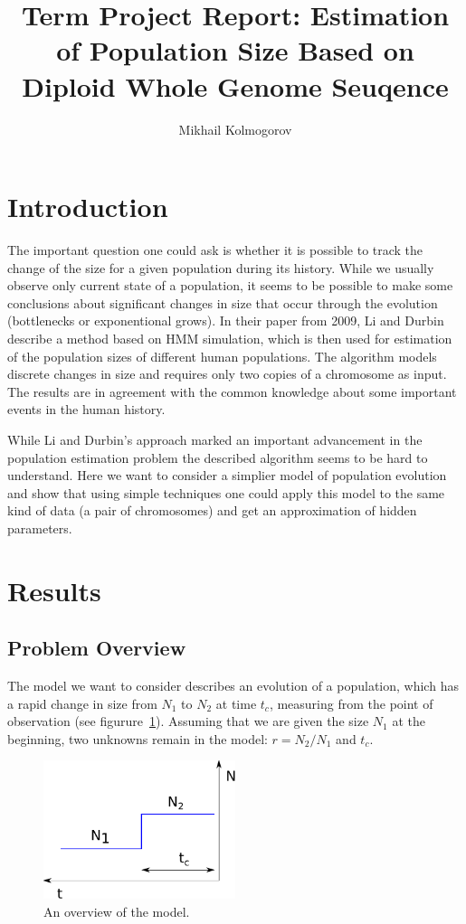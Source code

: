 \documentclass[a4paper]{article}
\begin{document}
\title{Term Project Report: Estimation of Population Size Based on Diploid Whole Genome Seuqence}
\author{Mikhail Kolmogorov}
\maketitle

\section{Introduction}

The important question one could ask is whether it is possible to track the change of the size for
a given population during its history. While we usually observe only current state
of a population, it seems to be possible to make some conclusions about significant
changes in size that occur through the evolution (bottlenecks or exponentional grows). 
In their paper from 2009, Li and Durbin describe a method based on HMM simulation,
which is then used for estimation of the population sizes of different human populations.
The algorithm models discrete changes in size and requires only two copies of a chromosome as input.
The results are in agreement with the common knowledge about some important
events in the human history.

While Li and Durbin's approach marked an important advancement in the population estimation
problem the described algorithm seems to be hard to understand. Here we want to consider
a simplier model of population evolution and show that using simple techniques one
could apply this model to the same kind of data (a pair of chromosomes) and get an
approximation of hidden parameters.

\section{Results}

\subsection{Problem Overview}

The model we want to consider describes an evolution of a population, which has
a rapid change in size from $N_1$ to $N_2$ at time $t_c$, measuring from
the point of observation (see figurure~\ref{fig:model}). Assuming that we are given the size $N_1$ at
the beginning, two unknowns remain in the model: $r = N_2/N_1$ and $t_c$.

\begin{figure} [h]
\centering
\includegraphics[width=0.5\textwidth]{model.pdf}
\caption{An overview of the model.}
\label{fig:model}
\end{figure}
\end{document}
